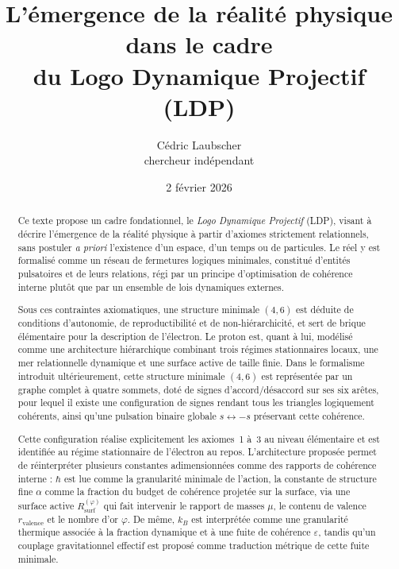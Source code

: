 \documentclass[11pt,a4paper]{article}
\title{L’émergence de la réalité physique dans le cadre \\ du Logo Dynamique Projectif (LDP)}
\author{Cédric Laubscher\\
\small chercheur indépendant}
\date{2 février 2026}
\begin{document}
\maketitle

\begin{abstract}

Ce texte propose un cadre fondationnel, le \emph{Logo Dynamique Projectif} (LDP), visant à décrire l’émergence de la réalité physique à partir d’axiomes strictement relationnels, sans postuler \emph{a priori} l’existence d’un espace, d’un temps ou de particules. Le réel y est formalisé comme un réseau de fermetures logiques minimales, constitué d’entités pulsatoires et de leurs relations, régi par un principe d’optimisation de cohérence interne plutôt que par un ensemble de lois dynamiques externes.

Sous ces contraintes axiomatiques, une structure minimale \(\left(4,6\right)\) est déduite de conditions d’autonomie, de reproductibilité et de non‑hiérarchicité, et sert de brique élémentaire pour la description de l’électron. Le proton est, quant à lui, modélisé comme une architecture hiérarchique combinant trois régimes stationnaires locaux, une mer relationnelle dynamique et une surface active de taille finie. Dans le formalisme introduit ultérieurement, cette structure minimale \(\left(4,6\right)\) est représentée par un graphe complet à quatre sommets, doté de signes d’accord/désaccord sur ses six arêtes, pour lequel il existe une configuration de signes rendant tous les triangles logiquement cohérents, ainsi qu’une pulsation binaire globale \(s \leftrightarrow -s\) préservant cette cohérence.

Cette configuration réalise explicitement les axiomes~1 à~3 au niveau élémentaire et est identifiée au régime stationnaire de l’électron au repos. L’architecture proposée permet de réinterpréter plusieurs constantes adimensionnées comme des rapports de cohérence interne : \(\hbar\) est lue comme la granularité minimale de l’action, la constante de structure fine \(\alpha\) comme la fraction du budget de cohérence projetée sur la surface, via une surface active \(R_{\mathrm{surf}}^{\left(\varphi\right)}\) qui fait intervenir le rapport de masses \(\mu\), le contenu de valence \(r_{\mathrm{valence}}\) et le nombre d’or \(\varphi\). De même, \(k_B\) est interprétée comme une granularité thermique associée à la fraction dynamique et à une fuite de cohérence \(\varepsilon\), tandis qu’un couplage gravitationnel effectif est proposé comme traduction métrique de cette fuite minimale.


\end{abstract}
\end{document}
